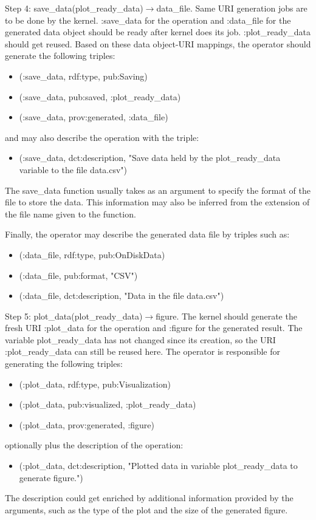 Step 4: save\_data(plot\_ready\_data)$\rightarrow$data\_file. Same URI generation jobs are to be done by the kernel. :save\_data for the operation and :data\_file for the generated data object should be ready after kernel does its job. :plot\_ready\_data should get reused. Based on these data object-URI mappings, the operator should generate the following triples:
\begin{itemize}
	\item (:save\_data, rdf:type, pub:Saving)
	\item (:save\_data, pub:saved, :plot\_ready\_data)
	\item (:save\_data, prov:generated, :data\_file)
\end{itemize}
and may also describe the operation with the triple:
\begin{itemize}
	\item (:save\_data, dct:description, "Save data held by the plot\_ready\_data variable to the file data.csv")
\end{itemize}
The save\_data function usually takes as an argument to specify the format of the file to store the data. This information may also be inferred from the extension of the file name given to the function.

Finally, the operator may describe the generated data file by triples such as:
\begin{itemize}
	\item (:data\_file, rdf:type, pub:OnDiskData)
	\item (:data\_file, pub:format, "CSV")
	\item (:data\_file, dct:description, "Data in the file data.csv")
\end{itemize}

Step 5: plot\_data(plot\_ready\_data)$\rightarrow$figure. The kernel should generate the fresh URI :plot\_data for the operation and :figure for the generated result. The variable plot\_ready\_data has not changed since its creation, so the URI :plot\_ready\_data can still be reused here. The operator is responsible for generating the following triples:
\begin{itemize}
	\item (:plot\_data, rdf:type, pub:Visualization)
	\item (:plot\_data, pub:visualized, :plot\_ready\_data)
	\item (:plot\_data, prov:generated, :figure)
\end{itemize}
optionally plus the description of the operation:
\begin{itemize}
	\item (:plot\_data, dct:description, "Plotted data in variable plot\_ready\_data to generate figure.")
\end{itemize}
The description could get enriched by additional information provided by the arguments, such as the type of the plot and the size of the generated figure.


